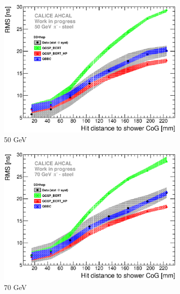 \begin{figure}[htbp!]
  \hfill
  \begin{subfigure}[t]{0.49\textwidth}
    \centering
    \includegraphics[width=1\textwidth]{../Thesis_Plots/Timing/Pions/Plots/ComparisonToSim/RMS_Radius_50GeV_SSF_DD4hep.eps}
    \caption{50 GeV}\label{fig:Radius_SSF_RMS_SimData_50GeV_DD4hep}
  \end{subfigure}
  \hfill
  \begin{subfigure}[t]{0.49\textwidth}
    \centering
    \includegraphics[width=1\textwidth]{../Thesis_Plots/Timing/Pions/Plots/ComparisonToSim/RMS_Radius_70GeV_SSF_DD4hep.eps}
    \caption{70 GeV}\label{fig:Radius_SSF_RMS_SimData_70GeV_DD4hep}
  \end{subfigure}
  \hfill
  \begin{subfigure}[t]{0.49\textwidth}

\end{subfigure}
\end{figure}
